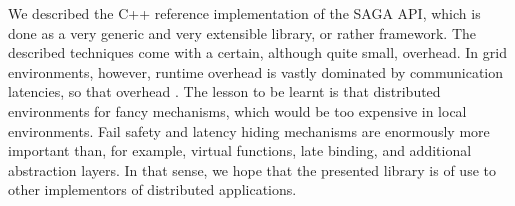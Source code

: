 
We described the C++ reference implementation of the SAGA API, which
is done as a very generic and very extensible library, or rather
framework.  The described techniques come with a certain,
although quite small, overhead.  In grid environments, however,
runtime overhead is vastly dominated by communication latencies, so
that  overhead .  The lesson to be learnt is
that distributed environments  for fancy mechanisms, which
would be too expensive in local environments.  Fail safety and latency
hiding mechanisms are enormously more important than, for example,
virtual functions, late binding, and additional abstraction layers.  
In that sense, we hope that the presented library is
of use to other implementors of distributed applications.


